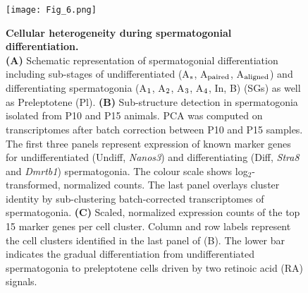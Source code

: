 \begin{figure}[!h]
\centering
\texttt{[image: Fig\_6.png]}
\caption[Cellular heterogeneity during spermatogonial differentiation]{\textbf{Cellular heterogeneity during spermatogonial differentiation.} \\
\textbf{(A)} Schematic representation of spermatogonial differentiation including sub-stages of undifferentiated (A$_\textnormal{s}$, A$_\textnormal{paired}$, A$_\textnormal{aligned}$) and differentiating spermatogonia (A$_\textnormal{1}$, A$_\textnormal{2}$, A$_\textnormal{3}$, A$_\textnormal{4}$, In, B) (SGs) as well as Preleptotene (Pl). \textbf{(B)} Sub-structure detection in spermatogonia isolated from P10 and P15 animals. PCA was computed on transcriptomes after batch correction between P10 and P15 samples. The first three panels represent expression of known marker genes for undifferentiated (Undiff, \textit{Nanos3}) and differentiating (Diff, \textit{Stra8} and \textit{Dmrtb1}) spermatogonia. The colour scale shows log$_2$-transformed, normalized counts. The last panel overlays cluster identity by sub-clustering batch-corrected transcriptomes of spermatogonia. \textbf{(C)} Scaled, normalized expression counts of the top 15 marker genes per cell cluster. Column and row labels represent the cell clusters identified in the last panel of (B). The lower bar indicates the gradual differentiation from undifferentiated spermatogonia to preleptotene cells driven by two retinoic acid (RA) signals. }
\label{fig3:spermatogonia}
\end{figure}

